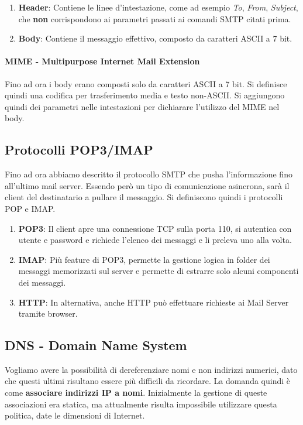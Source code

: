 \documentclass{article}
\begin{document}
\begin{enumerate}
    \item \textbf{Header}: Contiene le linee d'intestazione, come ad esempio \textit{To}, \textit{From}, \textit{Subject}, che \textbf{non} corrispondono ai parametri passati ai comandi SMTP citati prima. 
    \item \textbf{Body}: Contiene il messaggio effettivo, composto da caratteri ASCII a 7 bit.
\end{enumerate}

\paragraph{MIME - Multipurpose Internet Mail Extension} Fino ad ora i body erano composti solo da caratteri ASCII a 7 bit. Si definisce quindi una codifica per trasferimento media e testo non-ASCII.
Si aggiungono quindi dei parametri nelle intestazioni per dichiarare l'utilizzo del MIME nel body.

\subsection{Protocolli POP3/IMAP}

Fino ad ora abbiamo descritto il protocollo SMTP che pusha l'informazione fino all'ultimo mail server. Essendo però un tipo di comunicazione asincrona, sarà il client del destinatario a pullare il messaggio. Si definiscono quindi i protocolli
POP e IMAP.

\begin{enumerate}
    \item \textbf{POP3}: Il client apre una connessione TCP sulla porta 110, si autentica con utente e password e richiede l'elenco dei messaggi e li preleva uno alla volta.
    \item \textbf{IMAP}: Più feature di POP3, permette la gestione logica in folder dei messaggi memorizzati sul server e permette di estrarre solo alcuni componenti dei messaggi.
    \item \textbf{HTTP}: In alternativa, anche HTTP può effettuare richieste ai Mail Server tramite browser.
\end{enumerate}

\subsection{DNS - Domain Name System}

Vogliamo avere la possibilità di dereferenziare nomi e non indirizzi numerici, dato che questi ultimi risultano essere più difficili da ricordare. La domanda quindi è come \textbf{associare indirizzi IP a nomi}.
Inizialmente la gestione di queste associazioni era statica, ma attualmente risulta impossibile utilizzare questa politica, date le dimensioni di Internet.
\end{document}
